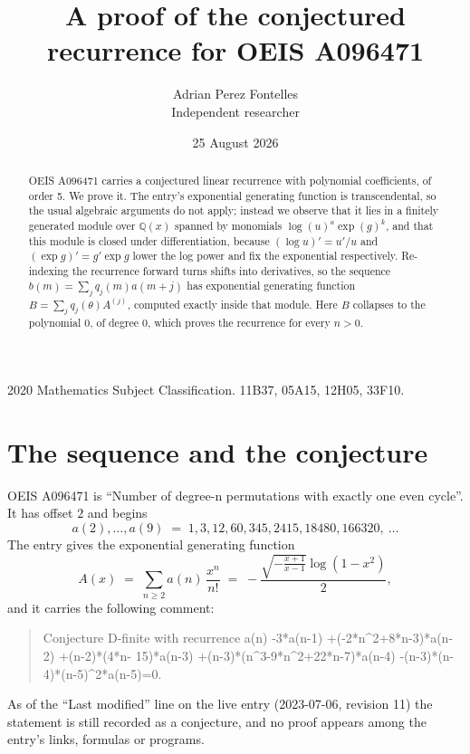 \documentclass[11pt,a4paper]{article}
\title{A proof of the conjectured recurrence for OEIS A096471}
\author{Adrian Perez Fontelles\\ \small Independent researcher}
\date{25 August 2026}
\theoremstyle{plain}
\theoremstyle{definition}
\begin{document}
\maketitle

\begin{abstract}
OEIS A096471 carries a conjectured linear recurrence with polynomial coefficients, of
order 5. We prove it. The entry's exponential generating function is
transcendental, so the usual algebraic arguments do not apply; instead we observe that it
lies in a finitely generated module over $\mathbb{Q}(x)$ spanned by monomials
$\log(u)^{a}\exp(g)^{k}$, and that this module is closed under differentiation, because
$(\log u)'=u'/u$ and $(\exp g)'=g'\exp g$ lower the log power and fix the exponential
respectively. Re-indexing the recurrence forward turns shifts into derivatives, so the
sequence $b(m)=\sum_{j}q_{j}(m)a(m+j)$ has exponential generating function
$B=\sum_{j}q_{j}(\theta)A^{(j)}$, computed exactly inside that module. Here $B$ collapses
to the polynomial $0$, of degree $0$, which proves the recurrence for every
$n>0$.
\end{abstract}

\noindent\small 2020 Mathematics Subject Classification. 11B37, 05A15, 12H05, 33F10.\normalsize

\section{The sequence and the conjecture}

OEIS A096471 is ``Number of degree-n permutations with exactly one even cycle''. It has offset $2$ and begins
\[
a(2),\dots,a(9)\;=\;1, 3, 12, 60, 345, 2415, 18480, 166320,\ \dots
\]
The entry gives the exponential generating function
\begin{equation}\label{eq:gf}
A(x)\;=\;\sum_{n\ge 2} a(n)\,\frac{x^{n}}{n!}\;=\;- \frac{\sqrt{- \frac{x + 1}{x - 1}} \log{\left(1 - x^{2} \right)}}{2} ,
\end{equation}
and it carries the following comment:
\begin{quote}\small
Conjecture D-finite with recurrence a(n) -3*a(n-1) +(-2*n\textasciicircum{}2+8*n-3)*a(n-2) +(n-2)*(4*n- 15)*a(n-3) +(n-3)*(n\textasciicircum{}3-9*n\textasciicircum{}2+22*n-7)*a(n-4) -(n-3)*(n-4)*(n-5)\textasciicircum{}2*a(n-5)=0.
\end{quote}
As of the ``Last modified'' line on the live entry (2023-07-06, revision 11) the
statement is still recorded as a conjecture, and no proof appears among the entry's links,
formulas or programs.
\end{document}
